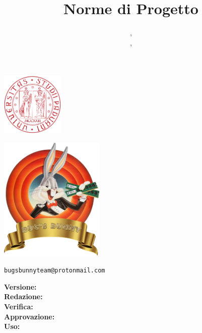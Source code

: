 \documentclass{classes/base}
\title{Norme di Progetto}
\author{\angela, \\ \matteo, \\ \giulio}
\begin{document}
	\begin{titlepage}
		\makeatletter
		
		\begin{minipage}[]{0.3\textwidth}
			\includegraphics[width=3cm]{assets/unipd}
		\end{minipage}
		\begin{minipage}[]{0.7\textwidth}
		\end{minipage}
		\begin{center}
			
			\includegraphics[width=5cm]{assets/logo}
			
			\Huge
			\textbf{\teamname}
			
			\vspace{2cm}
			
			\textbf{\@title}

			\vspace{1cm}
			
			\small
			\texttt{bugsbunnyteam@protonmail.com}

			\vspace{1.5cm}
			\Large
			
			\ifdefined\@versione
			\textbf{Versione:} \@versione \\
			\fi
			\textbf{Redazione:} \@author \\
			\textbf{Verifica:} \@verificatore \\
			\textbf{Approvazione:} \@approvatore \\
			\textbf{Uso:} \@uso \\
			
			\vfill
			\makeatother
		\end{center}
	\end{titlepage}
	
\end{document}

